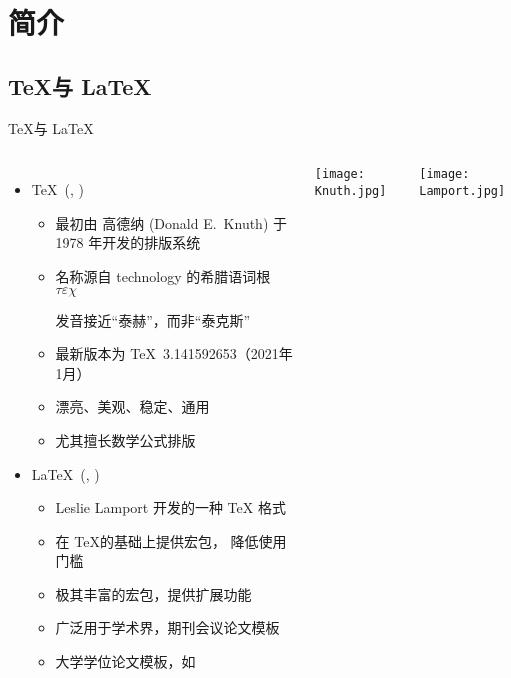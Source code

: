 
\section{简介}

\subsection{\TeX 与 \LaTeX}

\begin{frame}[fragile]{\TeX 与 \LaTeX}
  \begin{columns}[T]
    \begin{itemize}
      \item \TeX\ (,
        )
        \begin{itemize}
          \item 最初由 高德纳 (Donald E.~Knuth) 于 1978 年开发的排版系统
          \item 名称源自 technology 的希腊语词根 $\tau\varepsilon\chi$ \par
                发音接近“泰赫”，而非“泰克斯”
          \item 最新版本为 \TeX\ 3.141592653（2021年1月）
          \item 漂亮、美观、稳定、通用
          \item 尤其擅长数学公式排版
        \end{itemize}
      \item \LaTeX\ (, )
        \begin{itemize}
          \item Leslie Lamport 开发的一种 \TeX{} 格式
          \item 在 \TeX 的基础上提供宏包， 降低使用门槛
          \item 极其丰富的宏包，提供扩展功能
          \item 广泛用于学术界，期刊会议论文模板
          \item 大学学位论文模板，如 \SJTUThesis
        \end{itemize}
    \end{itemize}
    \texttt{[image: Knuth.jpg]}

    \texttt{[image: Lamport.jpg]}
  \end{columns}
\end{frame}

